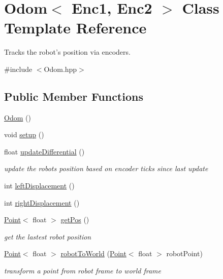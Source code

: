 \hypertarget{classOdom}{\section{Odom$<$ Enc1, Enc2 $>$ Class Template Reference}
\label{classOdom}
}


Tracks the robot's position via encoders.  




{\ttfamily \#include $<$Odom.\-hpp$>$}

\subsection*{Public Member Functions}
\begin{DoxyCompactItemize}
\item 
\hyperlink{classOdom_ab45cc0ea11f5300b84afe6133859a2c2}{Odom} ()
\item 
void \hyperlink{classOdom_a6736e8d83d7276bc7b4a656b9dc8dda5}{setup} ()
\item 
float \hyperlink{classOdom_ab1627e2cf01e2d9869d24027a1a98469}{update\-Differential} ()
\begin{DoxyCompactList}\small\item\em update the robots position based on encoder ticks since last update \end{DoxyCompactList}\item 
int \hyperlink{classOdom_aad18072b90a4f0951165577a014024de}{left\-Displacement} ()
\item 
int \hyperlink{classOdom_aee42d44f07335600703f40061a01836e}{right\-Displacement} ()
\item 
\hyperlink{classPoint}{Point}$<$ float $>$ \hyperlink{classOdom_adf58a66718029d08c7bd47d5cebfefb6}{get\-Pos} ()
\begin{DoxyCompactList}\small\item\em get the lastest robot position \end{DoxyCompactList}\item 
\hyperlink{classPoint}{Point}$<$ float $>$ \hyperlink{classOdom_a07f630244bd18439ab5e057dfab0587f}{robot\-To\-World} (\hyperlink{classPoint}{Point}$<$ float $>$ robot\-Point)
\begin{DoxyCompactList}\small\item\em transform a point from robot frame to world frame \end{DoxyCompactList}\end{DoxyCompactItemize}
